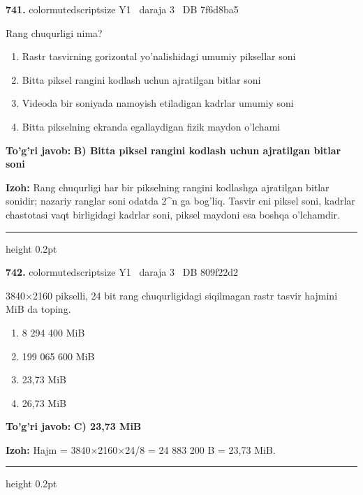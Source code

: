 \documentclass[10pt,a4paper,oneside]{article}
\begin{document}
\noindent\textbf{\color{ink}741.}  {color{muted}scriptsize Y1 \textbullet\ daraja 3 \textbullet\ DB 7f6d8ba5}
\par
Rang chuqurligi nima?
\begin{enumerate}[label=\Alph*),leftmargin=9mm]
\item Rastr tasvirning gorizontal yo'nalishidagi umumiy piksellar soni
\item Bitta piksel rangini kodlash uchun ajratilgan bitlar soni
\item Videoda bir soniyada namoyish etiladigan kadrlar umumiy soni
\item Bitta pikselning ekranda egallaydigan fizik maydon o'lchami
\end{enumerate}
\begin{tcolorbox}[enhanced,breakable,colback=teal!4,colframe=teal!50!black,boxrule=0.5pt,arc=1.1mm,left=3mm,right=3mm,top=1.7mm,bottom=1.7mm,before skip=2mm,after skip=2mm]
\textbf{\color{teal}To'g'ri javob:} \textbf{B) Bitta piksel rangini kodlash uchun ajratilgan bitlar soni}
\par\smallskip
\textbf{Izoh:} Rang chuqurligi har bir pikselning rangini kodlashga ajratilgan bitlar sonidir; nazariy ranglar soni odatda 2\textasciicircum{}n ga bog'liq. Tasvir eni piksel soni, kadrlar chastotasi vaqt birligidagi kadrlar soni, piksel maydoni esa boshqa o'lchamdir.
\end{tcolorbox}
\vspace{2mm}\hrule height 0.2pt \vspace{3mm}

\noindent\textbf{\color{ink}742.}  {color{muted}scriptsize Y1 \textbullet\ daraja 3 \textbullet\ DB 809f22d2}
\par
3840\ensuremath{\times}2160 pikselli, 24 bit rang chuqurligidagi siqilmagan rastr tasvir hajmini MiB da toping.
\begin{enumerate}[label=\Alph*),leftmargin=9mm]
\item 8 294 400 MiB
\item 199 065 600 MiB
\item 23,73 MiB
\item 26,73 MiB
\end{enumerate}
\begin{tcolorbox}[enhanced,breakable,colback=teal!4,colframe=teal!50!black,boxrule=0.5pt,arc=1.1mm,left=3mm,right=3mm,top=1.7mm,bottom=1.7mm,before skip=2mm,after skip=2mm]
\textbf{\color{teal}To'g'ri javob:} \textbf{C) 23,73 MiB}
\par\smallskip
\textbf{Izoh:} Hajm = 3840\ensuremath{\times}2160\ensuremath{\times}24/8 = 24 883 200 B = 23,73 MiB.
\end{tcolorbox}
\vspace{2mm}\hrule height 0.2pt \vspace{3mm}
\end{document}
